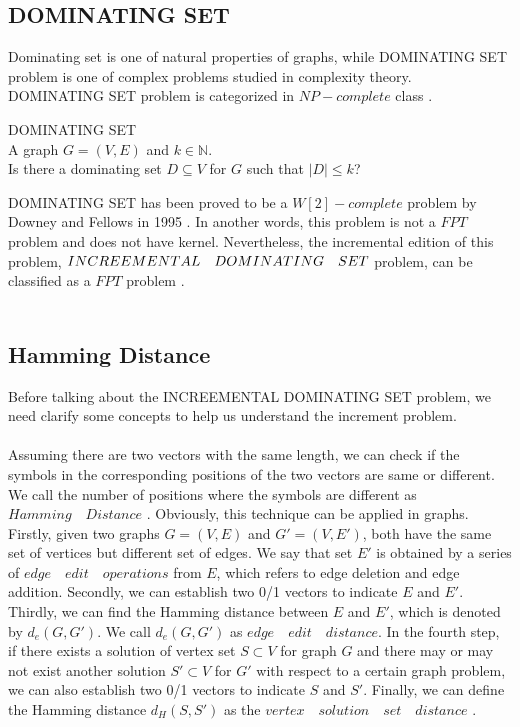 \subsection{\large{D}\normalsize{OMINATING} \Large{S}\normalsize{ET}} \label{subsec:comds}
Dominating set is one of natural properties of graphs, while \large{D}\normalsize{OMINATING} \Large{S}\normalsize{ET} problem is one of complex problems studied in complexity theory. \large{D}\normalsize{OMINATING} \Large{S}\normalsize{ET} problem is categorized in $NP-complete$ class \cite{garey1979}.
\begin{dproblem}
{\sc \large{D}\normalsize{OMINATING} \Large{S}\normalsize{ET}}\\
\instance A graph $G=(V,E)$ and $k \in \mathds{N}$.\\
\ques Is there a dominating set $D \subseteq V$ for $G$ such that $|D| \leqslant k$?\\
\cite{garey1979}
\end{dproblem}

\vskip -20pt
\large{D}\normalsize{OMINATING} \Large{S}\normalsize{ET} has been proved to be a $W[2]-complete$ problem by Downey and Fellows in 1995 \cite{downey1995}. In another words, this problem is not a $FPT$ problem and does not have kernel. Nevertheless, the incremental edition of this problem, $\large{I}\normalsize{NCREEMENTAL}\quad \large{D}\normalsize{OMINATING}\quad \Large{S}\normalsize{ET}$ problem, can be classified as a $FPT$ problem \cite{downey2014}.
\\
\\
\subsection{Hamming Distance}
Before talking about the \large{I}\normalsize{NCREEMENTAL} \large{D}\normalsize{OMINATING} \Large{S}\normalsize{ET} problem, we need clarify some concepts to help us understand the increment problem.
\\
\\
Assuming there are two vectors with the same length, we can check if the symbols in the corresponding positions of the two vectors are same or different. We call the number of positions where the symbols are different as $Hamming\quad Distance$ \cite{hamming1950error}. Obviously, this technique can be applied in graphs. Firstly, given two graphs $G=(V,E)$ and $G'=(V,E')$, both have the same set of vertices but different set of edges. We say that set $E'$ is obtained by a series of $edge\quad edit\quad operations$ from $E$, which refers to edge deletion and edge addition. Secondly, we can establish two 0/1 vectors to indicate $E$ and $E'$. Thirdly, we can find the Hamming distance between $E$ and $E'$, which is denoted by $d_e$$(G,G')$. We call $d_e$$(G,G')$ as $edge\quad edit\quad distance$. In the fourth step, if there exists a solution of vertex set $S \subset V$ for graph $G$ and there may or may not exist another solution $S' \subset V$ for $G'$ with respect to a certain graph problem, we can also establish two 0/1 vectors to indicate $S$ and $S'$. Finally, we can define the Hamming distance $d_H$$(S,S')$ as the $vertex\quad solution\quad set\quad distance$ \cite{downey2014}.
